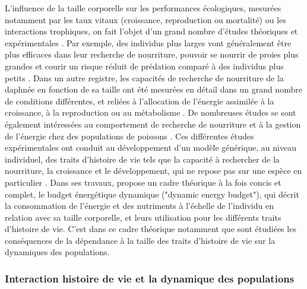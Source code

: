 L'influence de la taille corporelle sur les performances écologiques, mesurées
notamment par les taux vitaux (croissance, reproduction ou mortalité) ou les
interactions trophiques, on fait l'objet d'un grand nombre d'études théoriques
et expérimentales
\autocite[][,\ldots]{peters1986a,calder1996a,de-roos2001a,claessen2004a}. Par
exemple, des individus plus larges vont généralement être plus efficaces dans
leur recherche de nourriture, pouvoir se nourrir de proies plus grandes et
courir un risque réduit de prédation comparé à des individus plus petits
\autocite{paradis1996a}.
Dans un autre registre, les capacités de recherche de nourriture de la daphnée
en fonction de sa taille ont été mesurées en détail dans un grand nombre de
conditions différentes, et reliées à l'allocation de l'énergie assimilée à la
croissance, à la reproduction ou au métabolisme \autocite[par ex.
][]{lampert1978a,gurney1990a,mccauley1990a,kooijman2000a}. De nombreuses études
se sont également intéressées au comportement de recherche de nourriture et à la
gestion de l'énergie chez des populations de poissons \autocite[par ex.
][]{elliott1975a,mittelbach1981a,fuiman1994a,hjelm2001a}. Ces différentes études
expérimentales ont conduit au développement d'un modèle générique, au niveau
individuel, des traits d'histoire de vie tels que la capacité à rechercher de la
nourriture, la croissance et le développement, qui ne repose pas sur une espèce
en particulier \autocite{kooijman2000a,nisbet2000a,west2001a}. Dans ses travaux,
\textcite{kooijman2000a} propose un cadre théorique à la fois concis et
complet, le budget énergétique dynamique ("dynamic energy budget"), qui décrit
la consommation  de l'énergie et des nutriments à l'échelle de l'individu en
relation avec sa taille corporelle, et leurs utilisation pour les différents
traits d'histoire de vie. C'est dans ce cadre théorique notamment que sont
étudiées les conséquences de la dépendance à la taille des traits d'histoire de
vie sur la dynamiques des populations.

\subsubsection{Interaction histoire de vie et la dynamique des populations}

